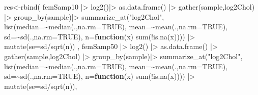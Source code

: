 \documentclass[
  dutch,
  letterpaper,
  12pt]{book}
\newenvironment{Shaded}{\begin{snugshade}}{\end{snugshade}}
\newcommand{\AttributeTok}[1]{\textcolor[rgb]{0.40,0.45,0.13}{#1}}
\newcommand{\ConstantTok}[1]{\textcolor[rgb]{0.56,0.35,0.01}{#1}}
\newcommand{\ControlFlowTok}[1]{\textcolor[rgb]{0.00,0.23,0.31}{\textbf{#1}}}
\newcommand{\FunctionTok}[1]{\textcolor[rgb]{0.28,0.35,0.67}{#1}}
\newcommand{\NormalTok}[1]{\textcolor[rgb]{0.00,0.23,0.31}{#1}}
\newcommand{\OtherTok}[1]{\textcolor[rgb]{0.00,0.23,0.31}{#1}}
\newcommand{\SpecialCharTok}[1]{\textcolor[rgb]{0.37,0.37,0.37}{#1}}
\newcommand{\StringTok}[1]{\textcolor[rgb]{0.13,0.47,0.30}{#1}}
\theoremstyle{definition}
\theoremstyle{definition}
\theoremstyle{definition}
\theoremstyle{remark}
\begin{document}
\begin{Shaded}
\begin{Highlighting}[]
\NormalTok{res}\OtherTok{\textless{}{-}}\FunctionTok{rbind}\NormalTok{(}
\NormalTok{  femSamp10 }\SpecialCharTok{|\textgreater{}}
    \FunctionTok{log2}\NormalTok{()}\SpecialCharTok{|\textgreater{}}
    \FunctionTok{as.data.frame}\NormalTok{() }\SpecialCharTok{|\textgreater{}}
    \FunctionTok{gather}\NormalTok{(sample,log2Chol) }\SpecialCharTok{|\textgreater{}}
    \FunctionTok{group\_by}\NormalTok{(sample)}\SpecialCharTok{|\textgreater{}}
    \FunctionTok{summarize\_at}\NormalTok{(}\StringTok{"log2Chol"}\NormalTok{,}
               \FunctionTok{list}\NormalTok{(}\AttributeTok{median=}\SpecialCharTok{\textasciitilde{}}\FunctionTok{median}\NormalTok{(.,}\AttributeTok{na.rm=}\ConstantTok{TRUE}\NormalTok{),}
                    \AttributeTok{mean=}\SpecialCharTok{\textasciitilde{}}\FunctionTok{mean}\NormalTok{(.,}\AttributeTok{na.rm=}\ConstantTok{TRUE}\NormalTok{),}
                    \AttributeTok{sd=}\SpecialCharTok{\textasciitilde{}}\FunctionTok{sd}\NormalTok{(.,}\AttributeTok{na.rm=}\ConstantTok{TRUE}\NormalTok{),}
                    \AttributeTok{n=}\ControlFlowTok{function}\NormalTok{(x) }\FunctionTok{sum}\NormalTok{(}\SpecialCharTok{!}\FunctionTok{is.na}\NormalTok{(x)))) }\SpecialCharTok{|\textgreater{}}
    \FunctionTok{mutate}\NormalTok{(}\AttributeTok{se=}\NormalTok{sd}\SpecialCharTok{/}\FunctionTok{sqrt}\NormalTok{(n)) ,}
\NormalTok{  femSamp50 }\SpecialCharTok{|\textgreater{}}
    \FunctionTok{log2}\NormalTok{() }\SpecialCharTok{|\textgreater{}}  
    \FunctionTok{as.data.frame}\NormalTok{() }\SpecialCharTok{|\textgreater{}}
    \FunctionTok{gather}\NormalTok{(sample,log2Chol) }\SpecialCharTok{|\textgreater{}}
    \FunctionTok{group\_by}\NormalTok{(sample)}\SpecialCharTok{|\textgreater{}}
    \FunctionTok{summarize\_at}\NormalTok{(}\StringTok{"log2Chol"}\NormalTok{,}
               \FunctionTok{list}\NormalTok{(}\AttributeTok{median=}\SpecialCharTok{\textasciitilde{}}\FunctionTok{median}\NormalTok{(.,}\AttributeTok{na.rm=}\ConstantTok{TRUE}\NormalTok{),}
                    \AttributeTok{mean=}\SpecialCharTok{\textasciitilde{}}\FunctionTok{mean}\NormalTok{(.,}\AttributeTok{na.rm=}\ConstantTok{TRUE}\NormalTok{),}
                    \AttributeTok{sd=}\SpecialCharTok{\textasciitilde{}}\FunctionTok{sd}\NormalTok{(.,}\AttributeTok{na.rm=}\ConstantTok{TRUE}\NormalTok{),}
                    \AttributeTok{n=}\ControlFlowTok{function}\NormalTok{(x) }\FunctionTok{sum}\NormalTok{(}\SpecialCharTok{!}\FunctionTok{is.na}\NormalTok{(x)))) }\SpecialCharTok{|\textgreater{}}
    \FunctionTok{mutate}\NormalTok{(}\AttributeTok{se=}\NormalTok{sd}\SpecialCharTok{/}\FunctionTok{sqrt}\NormalTok{(n)),}

\end{Highlighting}
\end{Shaded}
\end{document}
